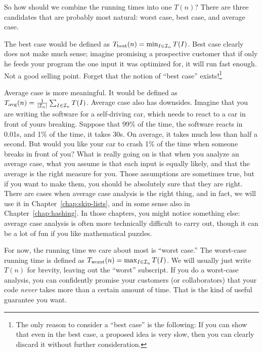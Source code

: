 So how should we combine the running times into one $T(n)$?
There are three candidates that are probably most natural:
worst case, best case, and average case.

The best case would be defined as 
$T_{\rm best}(n) = \min_{I \in \mathcal{I}_n} T(I)$.
Best case clearly does not make much sense; imagine promising a prospective
customer that if only he feeds your program the one input it was
optimized for, it will run fast enough. Not a good selling point.
Forget that the notion of ``best case'' exists!\footnote{The only
  reason to consider a ``best case'' is the following: If you can show
  that even in the best case, a proposed idea is very slow, then you
  can clearly discard it without further consideration.}

Average case is more meaningful. It would be defined as 
$T_{\rm avg}(n) = \frac{1}{|\mathcal{I}_n|} \sum_{I \in \mathcal{I}_n} T(I)$.
Average case also has downsides. 
Imagine that you are writing the software for a self-driving car,
which needs to react to a car in front of yours breaking. 
Suppose that 99\% of the time, the software reacts in 0.01s, and 1\%
of the time, it takes 30s. 
On average, it takes much less than half a second.
But would you like your car to crash 1\% of the time when someone
breaks in front of you? 
What is really going on is that when you analyze an average case,
what you assume is that each input is equally likely, and that the
average is the right measure for you. Those assumptions are sometimes
true, but if you want to make them, you should be absolutely sure that
they are right.
There are cases when average case analysis is the right thing,
and in fact, we will use it in Chapter~\ref{chap:skip-lists}, and in
some sense also in Chapter~\ref{chap:hashing}.
In those chapters, you might notice something else: average case
analysis is often more technically difficult to carry out,
though it can be a lot of fun if you like mathematical puzzles.

For now, the running time we care about most is ``worst case.'' 
The worst-case running time is defined as
$T_{\rm worst}(n) = \max_{I \in \mathcal{I}_n} T(I)$.
We will usually just write $T(n)$ for brevity,
leaving out the ``worst'' subscript.
If you do a worst-case analysis, you can confidently promise your
customers (or collaborators) that your code \emph{never} takes more
than a certain amount of time.
That is the kind of useful guarantee you want.

